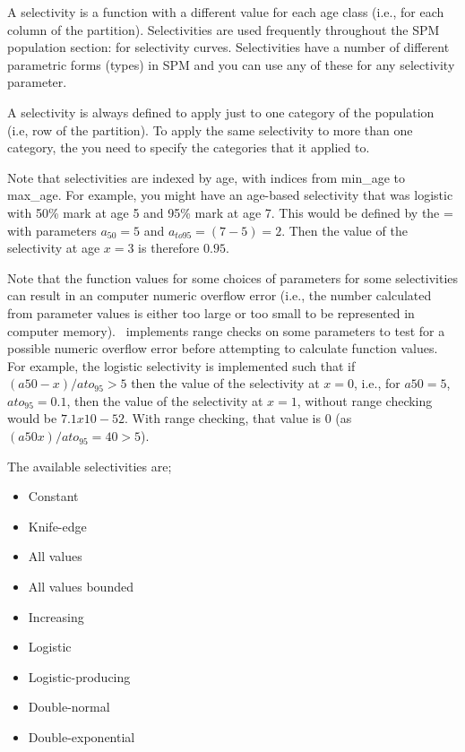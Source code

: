 A selectivity is a function with a different value for each age class (i.e., for each column of the partition). Selectivities are used frequently throughout the SPM population section: for selectivity curves. Selectivities have a number of different parametric forms (types) in SPM and you can use any of these for any selectivity parameter. 

A selectivity is always defined to apply just to one category of the population (i.e, row of the partition). To apply the same selectivity to more than one category, the you need to specify the categories that it applied to.

Note that selectivities are indexed by age, with indices from min\_age to max\_age. For example, you might have an age-based selectivity that was logistic with 50\% mark at age 5 and 95\% mark at age 7. This would be defined by the = with parameters $a_{50}=5$ and $a_{to95}=(7-5)=2$. Then the value of the selectivity at age $x=3$ is therefore $0.95$.

Note that the function values for some choices of parameters for some selectivities can result in an computer numeric overflow error (i.e., the number calculated from parameter values is either too large or too small to be represented in computer memory). \SPM\ implements range checks on some parameters to test for a possible numeric overflow error before attempting to calculate function values. For example, the logistic selectivity is implemented such that if $(a50-x)/ato_95 > 5$ then the value of the selectivity at $x=0$, i.e., for $a50=5$, $ato_95=0.1$, then the value of the selectivity at $x=1$, without range checking would be $7.1x10-52$. With range checking, that value is $0$ (as $(a50 x)/ato_95=40 > 5$).

The available selectivities are;

\begin{itemize}
  \item Constant
  \item Knife-edge
  \item All values
  \item All values bounded
  \item Increasing
  \item Logistic
  \item Logistic-producing
  \item Double-normal
  \item Double-exponential
\end{itemize}

